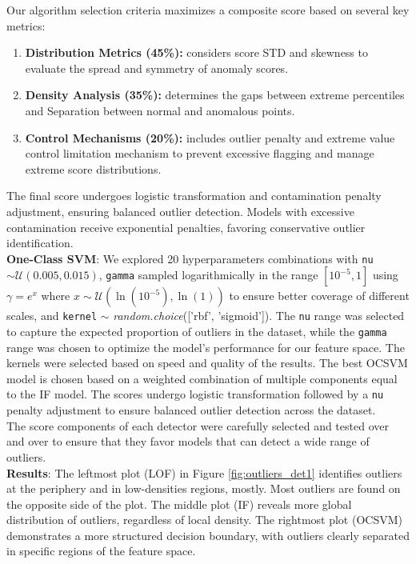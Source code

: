 \documentclass[a4paper, twoside]{article}
\begin{document}
Our algorithm selection criteria maximizes a composite score based on several key metrics:
\begin{enumerate}[noitemsep]
    \item \textbf{Distribution Metrics (45\%):} considers score STD and skewness to evaluate the spread and symmetry of anomaly scores.    
    \item \textbf{Density Analysis (35\%):} determines the gaps between extreme percentiles and Separation between normal and anomalous points.
    \item \textbf{Control Mechanisms (20\%):} includes outlier penalty and extreme value control limitation mechanism to prevent excessive flagging and manage extreme score distributions.
\end{enumerate}
The final score undergoes logistic transformation and contamination penalty adjustment, ensuring balanced outlier detection. Models with excessive contamination receive exponential penalties, favoring conservative outlier identification.
\\
\textbf{One-Class SVM}: We explored 20 hyperparameters combinations with \texttt{nu} \\ $\sim \mathcal{U}(0.005, 0.015)$, \texttt{gamma} sampled logarithmically in the range $[10^{-5}, 1]$ using $\gamma = e^x$ where $x \sim \mathcal{U}(\ln(10^{-5}), \ln(1))$ to ensure better coverage of different scales, and \texttt{kernel} $\sim$ \textit{random.choice}(['rbf', 'sigmoid']). The \texttt{nu} range was selected to capture the expected proportion of outliers in the dataset, while the \texttt{gamma} range was chosen to optimize the model's performance for our feature space. The kernels were selected based on speed and quality of the results.
The best OCSVM model is chosen based on a weighted combination of multiple components equal to the IF model.
The scores undergo logistic transformation followed by a \texttt{nu} penalty adjustment to ensure balanced outlier detection across the dataset.
\\
The score components of each detector were carefully selected and tested over and over to ensure that they favor models that can detect a wide range of outliers.
\\
\textbf{Results}:
The leftmost plot (LOF) in Figure \ref{fig:outliers_det1} identifies outliers at the periphery and in low-densities regions, mostly. Most outliers are found on the opposite side of the plot.
The middle plot (IF) reveals more global distribution of outliers, regardless of local density. The rightmost plot (OCSVM) demonstrates a more structured decision boundary, with outliers clearly separated in specific regions of the feature space.
\end{document}
